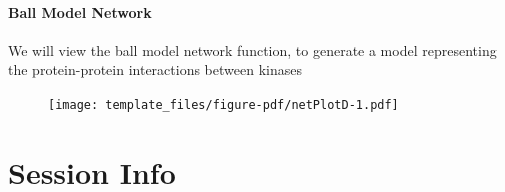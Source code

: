 \documentclass[
  letterpaper,
  DIV=11,
  numbers=noendperiod]{scrreport}
\begin{document}
\hypertarget{ball-model-network-3}{%
\subsubsection{Ball Model Network}\label{ball-model-network-3}}

We will view the ball model network function, to generate a model
representing the protein-protein interactions between kinases

\begin{figure}[htbp]

{\centering \texttt{[image: template\_files/figure-pdf/netPlotD-1.pdf]}

}

\end{figure}

\newpage

\hypertarget{session-info}{%
\chapter{Session Info}\label{session-info}}
\end{document}
